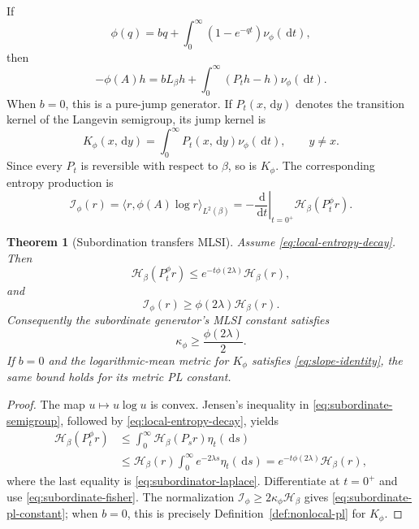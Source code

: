 \documentclass[11pt]{article}
\newtheorem{theorem}{Theorem}[section]
\theoremstyle{definition}
\newcommand{\dd}{\,\mathrm d}
\newcommand{\cI}{\mathcal I}
\newcommand{\cH}{\mathcal H}
\begin{document}
If
\begin{equation}\label{eq:bernstein-representation}
  \phi(q)=bq+\int_0^\infty(1-e^{-qt})\nu_\phi(\dd t),
\end{equation}
then
\begin{equation}\label{eq:subordinate-generator}
  -\phi(A)h
  =bL_\beta h
  +\int_0^\infty(P_t h-h)\nu_\phi(\dd t).
\end{equation}
When $b=0$, this is a pure-jump generator.  If
$P_t(x,\dd y)$ denotes the transition kernel of the Langevin semigroup, its
jump kernel is
\begin{equation}\label{eq:subordinate-jump-kernel}
  K_\phi(x,\dd y)
  =\int_0^\infty P_t(x,\dd y)\nu_\phi(\dd t),
  \qquad y\neq x.
\end{equation}
Since every $P_t$ is reversible with respect to $\beta$, so is
$K_\phi$.  The corresponding entropy production is
\begin{equation}\label{eq:subordinate-fisher}
  \cI_\phi(r)
  =\langle r,\phi(A)\log r\rangle_{L^2(\beta)}
  =-\left.\frac{\dd}{\dd t}\right|_{t=0^+}
       \cH_\beta(P_t^\phi r).
\end{equation}

\begin{theorem}[Subordination transfers MLSI]
\label{thm:subordination-pl}
Assume \eqref{eq:local-entropy-decay}.  Then
\begin{equation}\label{eq:subordinate-entropy-decay}
  \cH_\beta(P_t^\phi r)
  \leq e^{-t\phi(2\lambda)}\cH_\beta(r),
\end{equation}
and
\begin{equation}\label{eq:subordinate-pl}
  \cI_\phi(r)
  \geq\phi(2\lambda)\cH_\beta(r).
\end{equation}
Consequently the subordinate generator's MLSI constant satisfies
\begin{equation}\label{eq:subordinate-pl-constant}
  \kappa_\phi\geq\frac{\phi(2\lambda)}{2}.
\end{equation}
If $b=0$ and the logarithmic-mean metric for $K_\phi$ satisfies
\eqref{eq:slope-identity}, the same bound holds for its metric PL constant.
\end{theorem}

\begin{proof}
The map $u\mapsto u\log u$ is convex.  Jensen's inequality in
\eqref{eq:subordinate-semigroup}, followed by
\eqref{eq:local-entropy-decay}, yields
\begin{align*}
  \cH_\beta(P_t^\phi r)
  &\leq\int_0^\infty\cH_\beta(P_s r)\eta_t(\dd s)\\
  &\leq\cH_\beta(r)
      \int_0^\infty e^{-2\lambda s}\eta_t(\dd s)
   =e^{-t\phi(2\lambda)}\cH_\beta(r),
\end{align*}
where the last equality is \eqref{eq:subordinator-laplace}.
Differentiate at $t=0^+$ and use
\eqref{eq:subordinate-fisher}.  The normalization
$\cI_\phi\geq2\kappa_\phi\cH_\beta$ gives
\eqref{eq:subordinate-pl-constant}; when $b=0$, this is precisely
Definition~\ref{def:nonlocal-pl} for $K_\phi$.
\end{proof}
\end{document}
